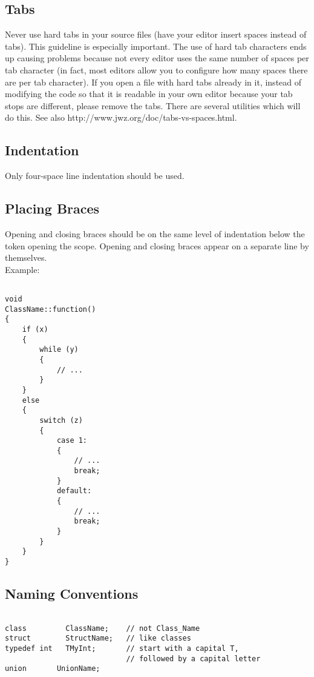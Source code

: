 \subsection{Tabs}

Never use hard tabs in your source files (have your editor insert spaces instead of tabs). This guideline is especially important. The use of hard tab characters ends up causing problems because not every editor uses the same number of spaces per tab character (in fact, most editors allow you to configure how many spaces there are per tab character). If you open a file with hard tabs already in it, instead of modifying the code so that it is readable in your own editor because your tab stops are different, please remove the tabs. There are several utilities which will do this. See also http://www.jwz.org/doc/tabs-vs-spaces.html.

\subsection{Indentation}

Only four-space line indentation should be used. 

\subsection{Placing Braces}

Opening and closing braces should be on the same level of indentation below the token opening the scope. Opening and closing braces appear on a separate line by themselves.
\\

Example:
\begin{verbatim}

void
ClassName::function()
{
    if (x)
    {
        while (y)
        {
            // ...
        }
    }
    else
    {
        switch (z)
        {
            case 1:
            {
                // ...
                break;
            }
            default:
            {
                // ...
                break;
            }
        }
    }
}

\end{verbatim}
\subsection{Naming Conventions}

\begin{verbatim}

class         ClassName;    // not Class_Name 
struct        StructName;   // like classes
typedef int   TMyInt;       // start with a capital T, 
                            // followed by a capital letter
union		UnionName;    

\end{verbatim}

